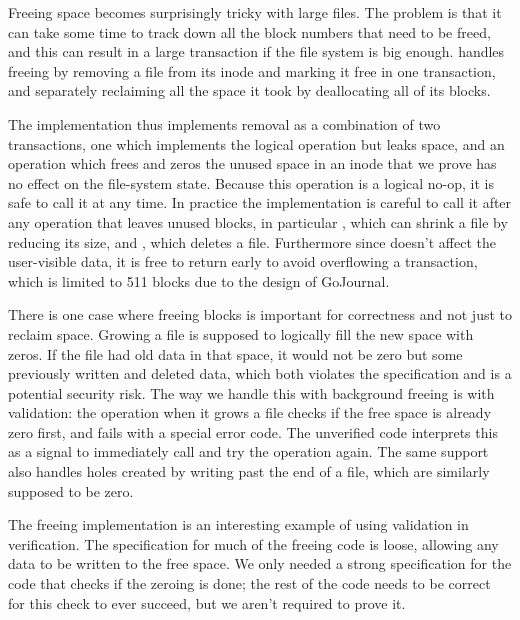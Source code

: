 Freeing space becomes surprisingly tricky with large files. The problem is that
it can take some time to track down all the block numbers that need to be freed,
and this can result in a large transaction if the file system is big enough.
\sys handles freeing by removing a file from its inode and marking it free in
one transaction, and separately reclaiming all the space it took by deallocating
all of its blocks.

The implementation thus implements removal as a combination of two transactions,
one which implements the logical operation but leaks space, and an operation
 which frees and zeros the unused space in an inode that
we prove has no effect on the file-system state. Because this operation is a
logical no-op, it is safe to call it at any time. In practice the implementation
is careful to call it after any operation that leaves unused blocks, in
particular , which can shrink a file by reducing its size, and
, which deletes a file. Furthermore since  doesn't
affect the user-visible data, it is free to return early to avoid overflowing a
transaction, which is limited to 511 blocks due to the design of GoJournal.

There is one case where freeing blocks is important for correctness and not just to reclaim space. Growing a file is supposed to logically fill the new space with
zeros. If the file had old data in that space, it would not be zero but some
previously written and deleted data, which both violates the specification and
is a potential security risk. The way we handle this with background freeing is
with validation: the  operation when it grows a file checks if the
free space is already zero first, and fails with a special error code. The
unverified code interprets this as a signal to immediately call
 and try the operation again. The same support also handles
holes created by writing past the end of a file, which are similarly supposed to
be zero.

The freeing implementation is an interesting example of using validation in
verification. The specification for much of the freeing code is loose, allowing
any data to be written to the free space. We only needed a strong specification
for the code that checks if the zeroing is done; the rest of the code needs to
be correct for this check to ever succeed, but we aren't required to prove it.

